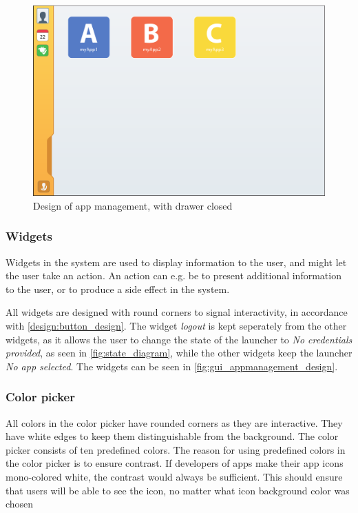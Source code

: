 \begin{figure}[!h]
	\centering
	\includegraphics[width=1\textwidth]{gfx/gui_appmanagement_closed.pdf}
	\caption{Design of app management, with drawer closed}
	\label{fig:gui_appmanagement_closed_design}
\end{figure}

\subsubsection{Widgets}
\label{par:widgets}
Widgets in the \giraf[] system are used to display information to the user, and might let the user take an action.  
An action can e.g. be to present additional information to the user, or to produce a side effect in the system. 

All widgets are designed with round corners to signal interactivity, in accordance with \autoref{design:button_design}.
The widget \emph{logout} is kept seperately from the other widgets, as it allows the user to change the state of the launcher to \emph{No credentials provided}, as seen in \autoref{fig:state_diagram}, while the other widgets keep the launcher \emph{No app selected}.
The widgets can be seen in \autoref{fig:gui_appmanagement_design}.

\subsubsection{Color picker}
\label{par:colorpicker}
All colors in the color picker have rounded corners as they are interactive.
They have white edges to keep them distinguishable from the background.
The color picker consists of ten predefined colors. 
The reason for using predefined colors in the color picker is to ensure contrast. 
If developers of \giraf[] apps make their app icons mono-colored white, the contrast would always be sufficient. 
This should ensure that users will be able to see the icon, no matter what icon background color was chosen